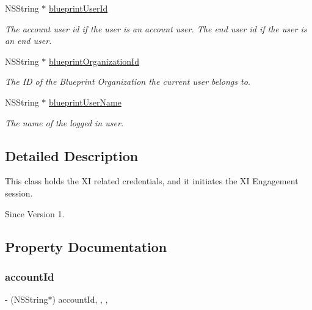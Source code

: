 \begin{DoxyCompactItemize}
N\+S\+String $\ast$ \hyperlink{class_x_i_access_a0cda9e9bdd8e42272b9f302aad785a9b}{blueprint\+User\+Id}
\begin{DoxyCompactList}\small\item\em The account user id if the user is an account user. The end user id if the user is an end user. \end{DoxyCompactList}\item 
N\+S\+String $\ast$ \hyperlink{class_x_i_access_acf10b571cca2607d9ac4d2650d6368ac}{blueprint\+Organization\+Id}
\begin{DoxyCompactList}\small\item\em The ID of the Blueprint Organization the current user belongs to. \end{DoxyCompactList}\item 
N\+S\+String $\ast$ \hyperlink{class_x_i_access_a8d12607e6e2dd1a4c19e88bdcf4a5924}{blueprint\+User\+Name}
\begin{DoxyCompactList}\small\item\em The name of the logged in user. \end{DoxyCompactList}\end{DoxyCompactItemize}


\subsection{Detailed Description}
This class holds the XI related credentials, and it initiates the XI Engagement session. 

\begin{DoxySince}{Since}
Version 1. 
\end{DoxySince}


\subsection{Property Documentation}
\hypertarget{class_x_i_access_ab7c9c9e22935201b0a02672e7fc40493}{}\label{class_x_i_access_ab7c9c9e22935201b0a02672e7fc40493} 
\subsubsection{\texorpdfstring{account\+Id}{accountId}}
{\footnotesize\ttfamily -\/ (N\+S\+String$\ast$) account\+Id\hspace{0.3cm}{\ttfamily [read]}, {\ttfamily [write]}, {\ttfamily [nonatomic]}, {\ttfamily [copy]}}



